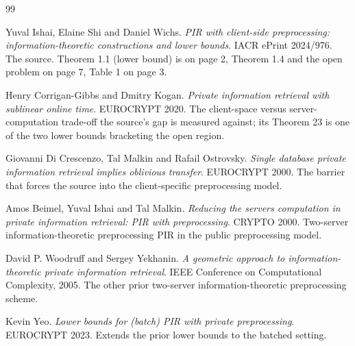 \documentclass{aicr-conjecture}
\begin{document}
\begin{aicrbibliography}{99}

Yuval Ishai, Elaine Shi and Daniel Wichs.
\emph{PIR with client-side preprocessing: information-theoretic
constructions and lower bounds}.
IACR ePrint 2024/976.
The source. Theorem 1.1 (lower bound) is on page 2, Theorem 1.4 and the
open problem on page 7, Table 1 on page 3.

Henry Corrigan-Gibbs and Dmitry Kogan.
\emph{Private information retrieval with sublinear online time}.
EUROCRYPT 2020.
The client-space versus server-computation trade-off the source's gap is
measured against; its Theorem 23 is one of the two lower bounds bracketing
the open region.

Giovanni Di Crescenzo, Tal Malkin and Rafail Ostrovsky.
\emph{Single database private information retrieval implies oblivious
transfer}.
EUROCRYPT 2000.
The barrier that forces the source into the client-specific
preprocessing model.

Amos Beimel, Yuval Ishai and Tal Malkin.
\emph{Reducing the servers computation in private information retrieval:
PIR with preprocessing}.
CRYPTO 2000.
Two-server information-theoretic preprocessing PIR in the public
preprocessing model.

David P. Woodruff and Sergey Yekhanin.
\emph{A geometric approach to information-theoretic private information
retrieval}.
IEEE Conference on Computational Complexity, 2005.
The other prior two-server information-theoretic preprocessing scheme.

Kevin Yeo.
\emph{Lower bounds for (batch) PIR with private preprocessing}.
EUROCRYPT 2023.
Extends the prior lower bounds to the batched setting.

\end{aicrbibliography}
\end{document}
